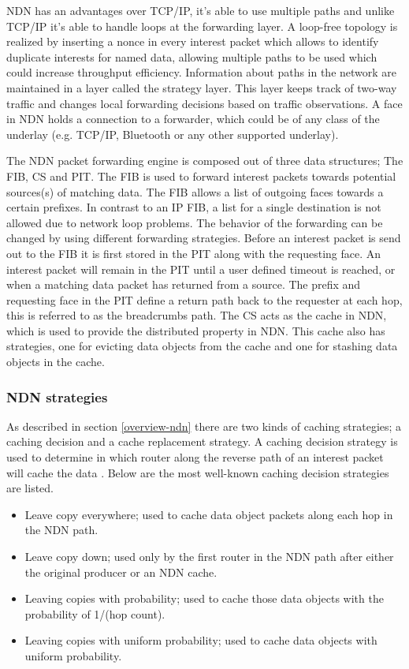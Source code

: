 NDN has an advantages over TCP/IP, it's able to use multiple paths and unlike TCP/IP it's able to handle loops at the forwarding layer. A loop-free topology is realized by inserting a nonce in every interest packet which allows to identify duplicate interests for named data, allowing multiple paths to be used which could increase throughput efficiency. Information about paths in the network are maintained in a layer called the strategy layer. This layer keeps track of two-way traffic and changes local forwarding decisions based on traffic observations. A face in NDN holds a connection to a forwarder, which could be of any class of the underlay (e.g. TCP/IP, Bluetooth or any other supported underlay).

The NDN packet forwarding engine is composed out of three data structures; The FIB, CS and PIT. The FIB is used to forward interest packets towards potential sources(s) of matching data. The FIB allows a list of outgoing faces towards a certain prefixes. In contrast to an IP FIB, a list for a single destination is not allowed due to network loop problems. The behavior of the forwarding can be changed by using different forwarding strategies. Before an interest packet is send out to the FIB it is first stored in the PIT along with the requesting face. An interest packet will remain in the PIT until a user defined timeout is reached, or when a matching data packet has returned from a source. The prefix and requesting face in the PIT define a return path back to the requester at each hop, this is referred to as the breadcrumbs path. The CS acts as the cache in NDN, which is used to provide the distributed property in NDN. This cache also has strategies, one for evicting data objects from the cache and one for stashing data objects in the cache.

\subsubsection{NDN strategies}
As described in section \ref{overview-ndn} there are two kinds of caching strategies; a caching decision and a cache replacement strategy. A caching decision strategy is used to determine in which router along the reverse path of an interest packet will cache the data \cite{koulouzis2018information}. Below are the most well-known caching decision strategies are listed.

\begin{itemize}
    \item Leave copy everywhere; used to cache data object packets along each hop in the NDN path.
    \item Leave copy down; used only by the first router in the NDN path after either the original producer or an NDN cache.
    \item Leaving copies with probability; used to cache those data objects with the probability of 1/(hop count).
    \item Leaving copies with uniform probability; used to cache data objects with uniform probability.
\end{itemize}

